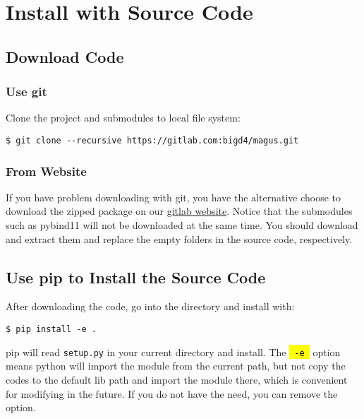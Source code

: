 \documentclass[12pt,oneside]{book}
\newcommand{\code}[1]{
  \begingroup
  \sethlcolor{Seashell}
  {\hl{\texttt{~#1~}}}
  \endgroup
}
\newcommand{\file}[1]{\texttt{#1}}
\begin{document}
\section{Install with Source Code}
\subsection{Download Code}
\subsubsection{Use git}
Clone the project and submodules to local file system:
\begin{tcolorbox}
    \begin{verbatim}
$ git clone --recursive https://gitlab.com:bigd4/magus.git
    \end{verbatim}
\end{tcolorbox}
\subsubsection{From Website}
If you have problem downloading with git, you have the alternative choose to download the zipped package on our \textcolor{blue}{\href{https://gitlab.com/bigd4/magus}{gitlab website}}. Notice that the submodules such as pybind11 will not be downloaded at the same time. You should download and extract them and replace the empty folders in the source code, respectively.

\subsection{Use pip to Install the Source Code}
After downloading the code, go into the directory and install with:
\begin{tcolorbox}
    \begin{verbatim}
$ pip install -e .
    \end{verbatim}
\end{tcolorbox}
pip will read \file{setup.py} in your current directory and install. The \code{-e} option means python will import the module from the current path, but not copy the codes to the default lib path and import the module there, which is convenient for modifying in the future. If you do not have the need, you can remove the option.
\end{document}
